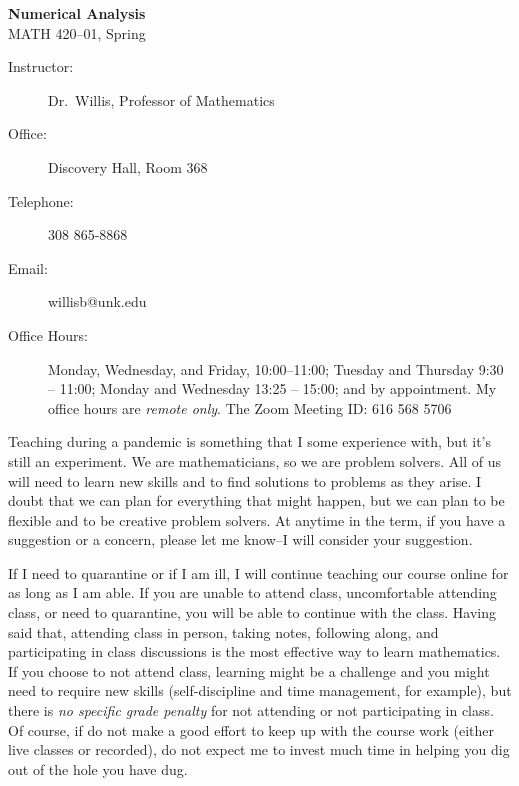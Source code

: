 \documentclass[12pt,fullpage]{article}
\newcounter{ex}\setcounter{ex}{0}
\begin{document}
\large
\begin{center}
    \textbf{Numerical Analysis}  \\
    {MATH 420--01, Spring \ay} \\
\end{center}

\vskip0.25in
\normalsize

\begin{center}
\begin{description}
    \item[Instructor:] Dr.\  Willis, Professor of Mathematics
    \item[Office:]  Discovery Hall, Room 368
    \item[Telephone:] 308 865-8868
   \item[Email:] willisb@unk.edu
   \item[Office Hours:] Monday, Wednesday, and  Friday, \mbox{10:00--11:00}; Tuesday and Thursday 9:30 -- 11:00; Monday and Wednesday 13:25 -- 15:00;  and by appointment.  My office hours are  \emph{remote only}.  The Zoom 
Meeting ID: 616 568 5706 
\end{description}
\end{center}



\noindent Teaching during a pandemic is something that I some experience with, but it's still  an experiment.  We are mathematicians, so we are problem solvers. All of us will need to learn new skills and to find solutions to problems as they arise.  I doubt that we can plan for everything that might happen, but we can plan to be flexible and to be creative problem solvers.  At anytime in the term, if you have a suggestion or a concern, please let me know--I will consider your suggestion.

If I need to quarantine or if I am ill,  I will continue teaching our course online for as long as I am able. If you are unable to attend class, uncomfortable attending class,  or need to quarantine, you will be able to continue with the class. Having said that,  attending class in person, taking notes, following along,  and participating  in class discussions is the most effective way to learn mathematics. If you choose to not attend class,  learning might be a challenge and you might need to  require new skills (self-discipline and time management, for example), but there is \emph{no specific grade penalty} for not attending or not participating in class. Of course, if do not make a good effort to keep up with the course work (either live classes or recorded),  do not expect me to invest much time in helping you dig out of the hole you have dug.
\end{document}
